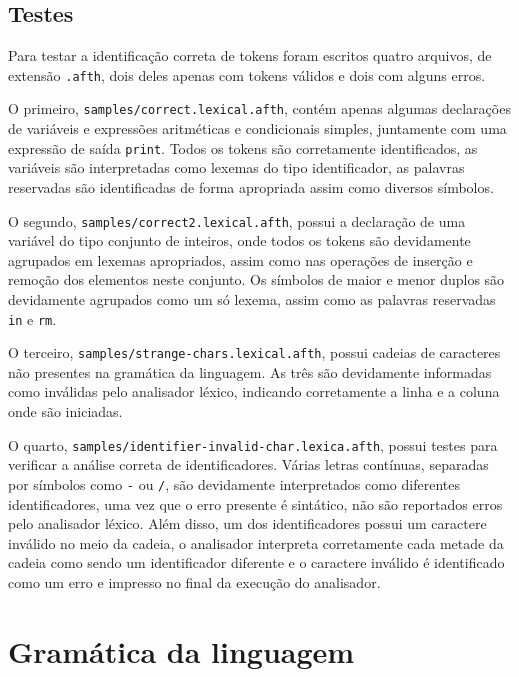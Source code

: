 \documentclass[
	article,			%
	11pt,				%
	oneside,			%
	a4paper,			%
	english,			%
	brazil,				%
	sumario=tradicional
	]{abntex2}
\begin{document}
\subsection{Testes}

Para testar a identificação correta de tokens foram escritos quatro
arquivos, de extensão \texttt{.afth}, dois deles apenas com tokens
válidos e dois com alguns erros.

O primeiro, \texttt{samples/correct.lexical.afth}, contém apenas
algumas declarações de variáveis e expressões aritméticas e condicionais
simples, juntamente com uma expressão de saída \texttt{print}.
Todos os tokens são corretamente identificados, as variáveis são
interpretadas como lexemas do tipo identificador, as palavras reservadas
são identificadas de forma apropriada assim como diversos símbolos.

O segundo, \texttt{samples/correct2.lexical.afth}, possui a declaração
de uma variável do tipo conjunto de inteiros, onde todos os tokens são
devidamente agrupados em lexemas apropriados, assim como nas operações
de inserção e remoção dos elementos neste conjunto. Os símbolos de
maior e menor duplos são devidamente agrupados como um só lexema, assim
como as palavras reservadas \texttt{in} e \texttt{rm}.

O terceiro, \texttt{samples/strange-chars.lexical.afth}, possui
cadeias de caracteres não presentes na gramática da linguagem. As três
são devidamente informadas como inválidas pelo analisador léxico,
indicando corretamente a linha e a coluna onde são iniciadas.

O quarto, \texttt{samples/identifier-invalid-char.lexica.afth}, possui
testes para verificar a análise correta de identificadores. Várias letras
contínuas, separadas por símbolos como \texttt{-} ou \texttt{/}, são
devidamente interpretados como diferentes identificadores, uma vez que
o erro presente é sintático, não são reportados erros pelo analisador léxico.
Além disso, um dos identificadores possui um caractere inválido no
meio da cadeia, o analisador interpreta corretamente cada metade da cadeia
como sendo um identificador diferente e o caractere inválido é identificado
como um erro e impresso no final da execução do analisador.

\section{Gramática da linguagem}


\setlength{\grammarparsep}{0pt plus 1pt minus 1pt} %
\setlength{\grammarindent}{12em} %
\end{document}
